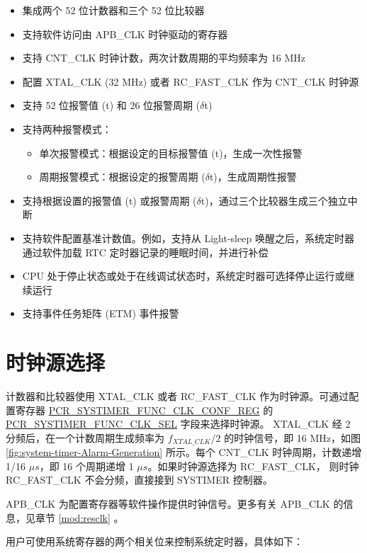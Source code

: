 \documentclass[main\_\_CN.tex]{subfiles}
\begin{document}
\begin{itemize}
    \item 集成两个 52 位计数器和三个 52 位比较器
    \item 支持软件访问由 APB\_CLK 时钟驱动的寄存器
    \item 支持 CNT\_CLK 时钟计数，两次计数周期的平均频率为 16 MHz
    \item 配置 XTAL\_CLK (32 MHz) 或者 RC\_FAST\_CLK 作为 CNT\_CLK 时钟源
    \item 支持 52 位报警值 (t) 和 26 位报警周期 ($\delta$t)
    \item 支持两种报警模式：
    \begin{itemize}
        \item 单次报警模式：根据设定的目标报警值 (t)，生成一次性报警
        \item 周期报警模式：根据设定的报警周期 ($\delta$t)，生成周期性报警
    \end{itemize}
    \item 支持根据设置的报警值 (t) 或报警周期 ($\delta$t)，通过三个比较器生成三个独立中断
    \item 支持软件配置基准计数值。例如，支持从 Light-sleep 唤醒之后，系统定时器通过软件加载 RTC 定时器记录的睡眠时间，并进行补偿
    \item CPU 处于停止状态或处于在线调试状态时，系统定时器可选择停止运行或继续运行
    \item 支持事件任务矩阵 (ETM) 事件报警
\end{itemize}

\section{时钟源选择}
计数器和比较器使用 XTAL\_CLK 或者 RC\_FAST\_CLK 作为时钟源。可通过配置寄存器 \hyperref[regdesc:PCRSYSTIMERFUNCCLKCONFREG]{PCR\_SYSTIMER\_FUNC\_CLK\_CONF\_REG} 的 \hyperref[fielddesc:PCRSYSTIMERFUNCCLKSEL]{PCR\_SYSTIMER\_FUNC\_CLK\_SEL} 字段来选择时钟源。 XTAL\_CLK 经 2 分频后，在一个计数周期生成频率为 $f_{XTAL\_CLK}/2$ 的时钟信号，即 16 MHz，如图 \ref{fig:system-timer-Alarm-Generation} 所示。每个 CNT\_CLK 时钟周期，计数递增 1/16 $\mu s$，即 16 个周期递增 1 $\mu s$。如果时钟源选择为 RC\_FAST\_CLK， 则时钟 RC\_FAST\_CLK 不会分频，直接接到 SYSTIMER 控制器。

APB\_CLK 为配置寄存器等软件操作提供时钟信号。更多有关 APB\_CLK 的信息，见章节 \ref{mod:resclk} \textit{}。

用户可使用系统寄存器的两个相关位来控制系统定时器，具体如下：
\end{document}
